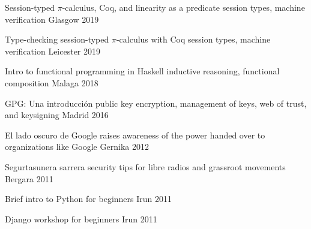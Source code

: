 \documentclass[11pt, a4paper]{awesome-cv}
\begin{document}
\newpage


\begin{cvhonors}
    \cvhonor
      {Session-typed $\pi$-calculus, Coq, and linearity as a predicate}
      {session types, machine verification}
      {Glasgow} %
      {2019} %

    \cvhonor
      {Type-checking session-typed $\pi$-calculus with Coq}
      {session types, machine verification}
      {Leicester} %
      {2019} %

    \cvhonor
      {Intro to functional programming in Haskell}
      {inductive reasoning, functional composition}
      {Malaga} %
      {2018} %

    \cvhonor
      {GPG: Una introducción}
      {public key encryption, management of keys, web of trust, and keysigning}
      {Madrid} %
      {2016} %

    \cvhonor
      {El lado oscuro de Google} %
      {raises awareness of the power handed over to organizations like Google}
      {Gernika}
      {2012}
  
    \cvhonor
      {Segurtasunera sarrera} %
      {security tips for libre radios and grassroot movements}
      {Bergara} %
      {2011} %
  
    \cvhonor
      {Brief intro to Python}
      {for beginners}
      {Irun}
      {2011}

    \cvhonor
      {Django workshop}
      {for beginners}
      {Irun}
      {2011}
\end{cvhonors}
\end{document}
